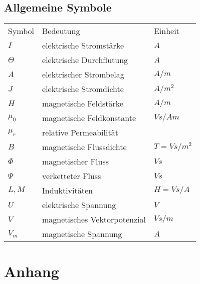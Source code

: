 \section*{Allgemeine Symbole}\label{s.sym.alg}
\begin{flushleft}\begin{tabularx}{\textwidth}{l l X}
Symbol & Bedeutung	& Einheit\\ 
$I$	& elektrische Stromstärke	&	$A$ \\
$\Theta$	&	elektrische Durchflutung 	&	$A$	\\
$A$			&	elektrischer Strombelag  	&  	$A/m$\\ 
$J$			&	elektrische Stromdichte		&	$A/m^2$ \\	
$H$			&	magnetische Feldstärke		&	$A/m$\\
$\mu_0$		&	magnetische Feldkonstante	&	$Vs/Am$\\
$\mu_r$		&	relative Permeabilität		&	\\
$B$			&	magnetische Flussdichte		&	$T = Vs/m^2$ \\
$\Phi$		&	magnetischer Fluss			&	$Vs$ \\
$\Psi$		&	verketteter Fluss			&	$Vs$ \\
$L, M$		&	Induktivitäten				&	$H = Vs/A$\\
$U$			&	elektrische Spannung		&	$V$ \\
$V$			&	magnetisches Vektorpotenzial&	$Vs/m$\\
$V_m$		&	magnetische Spannung		&	$A$
\end{tabularx}\end{flushleft}
%
\cleardoublepage

%
%
%
%
%
\cleardoublepage
\nocite{*}
\printbibliography
\appendix
\chapter{Anhang}



